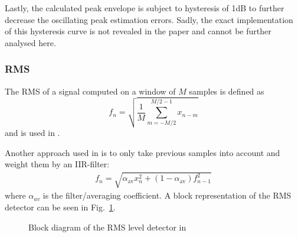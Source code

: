 \documentclass[../main2.tex]{subfiles}
\providecommand{\rootdir}{..}
\begin{document}
Lastly, the calculated peak envelope is subject to hysteresis of 1dB to further decrease the oscillating peak estimation errors. Sadly, the exact implementation of this hysteresis curve is not revealed in the paper and cannot be further analysed here.

\subsubsection{RMS}
The RMS of a signal computed on a window of $M$ samples is defined as
\begin{equation}
f_n = \sqrt{ \frac{1}{M} \sum_{m=-M/2}^{M/2-1} x_{n-m}}
\end{equation}
and is used in \cite{reiss2010rev}\cite{bosi1991low}.

Another approach used in \cite{mcnally1984dynamic} is to only take previous samples into account and weight them by an IIR-filter:
\begin{align*}
f_n = \sqrt{\alpha_{\text{av}} x_{n}^2+ (1-\alpha_{\text{av}}) f_{n-1}^2}
\end{align*}
where $\alpha_{av}$ is the filter/averaging coefficient. A block representation of the RMS detector can be seen in Fig.~\ref{fig:block_mcnally_theory_rms}.%
\begin{figure}[h]
\centerline{}
\caption{Block diagram of the RMS level detector in \cite{mcnally1984dynamic}}
\label{fig:block_mcnally_theory_rms}
\end{figure}
\end{document}
